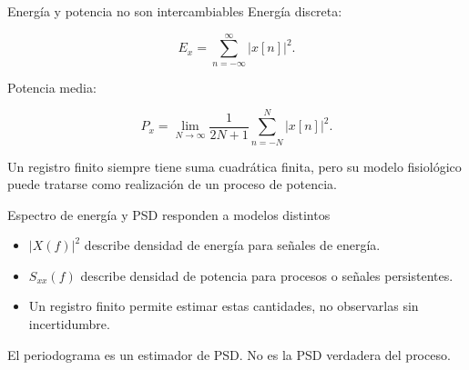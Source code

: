 \documentclass[
  ignorenonframetext,
  aspectratio=169,
  spanish,
]{beamer}
\providecommand{\faExclamation}{\faIcon{exclamation}}
\providecommand{\tightlist}{%
  \setlength{\itemsep}{0pt}\setlength{\parskip}{0pt}}
\begin{document}
\begin{frame}{Energía y potencia no son intercambiables}
  \protect{}\label{energuxeda-y-potencia-no-son-intercambiables}
  Energía discreta:

  \[E_x=\sum_{n=-\infty}^{\infty}|x[n]|^2.\]

  Potencia media:

  \[P_x=\lim_{N\to\infty}\frac{1}{2N+1}\sum_{n=-N}^{N}|x[n]|^2.\]

  \begin{tcolorbox}[enhanced jigsaw, arc=.35mm, bottomrule=.15mm, bottomtitle=1mm, breakable, colback=white, colbacktitle=quarto-callout-warning-color!10!white, colframe=quarto-callout-warning-color-frame, coltitle=black, left=2mm, leftrule=.75mm, opacityback=0, opacitybacktitle=0.6, rightrule=.15mm, title=\textcolor{quarto-callout-warning-color}{\faExclamationTriangle}\hspace{0.5em}{Advertencia}, titlerule=0mm, toprule=.15mm, toptitle=1mm]

    Un registro finito siempre tiene suma cuadrática finita, pero su modelo
    fisiológico puede tratarse como realización de un proceso de potencia.

  \end{tcolorbox}
\end{frame}

\begin{frame}{Espectro de energía y PSD responden a modelos distintos}
  \protect{}\label{espectro-de-energuxeda-y-psd-responden-a-modelos-distintos}
  \begin{itemize}
    \tightlist
    \item
          \(|X(f)|^2\) describe densidad de energía para señales de energía.
    \item
          \(S_{xx}(f)\) describe densidad de potencia para procesos o señales
          persistentes.
    \item
          Un registro finito permite estimar estas cantidades, no observarlas
          sin incertidumbre.
  \end{itemize}

  \begin{tcolorbox}[enhanced jigsaw, arc=.35mm, bottomrule=.15mm, bottomtitle=1mm, breakable, colback=white, colbacktitle=quarto-callout-important-color!10!white, colframe=quarto-callout-important-color-frame, coltitle=black, left=2mm, leftrule=.75mm, opacityback=0, opacitybacktitle=0.6, rightrule=.15mm, title=\textcolor{quarto-callout-important-color}{\faExclamation}\hspace{0.5em}{Importante}, titlerule=0mm, toprule=.15mm, toptitle=1mm]

    El periodograma es un estimador de PSD. No es la PSD verdadera del
    proceso.

  \end{tcolorbox}
\end{frame}
\end{document}
